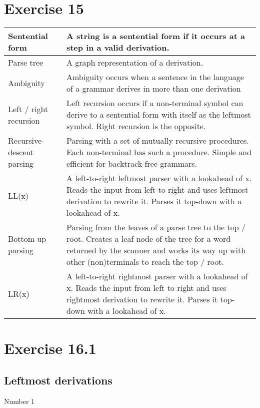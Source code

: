 \documentclass[11pt]{article} %
\begin{document}
\section*{Exercise 15}
\begin{tabular}{l|p{11cm}} \hline

Sentential form
& A string is a sentential form if it occurs at a step in a valid derivation. \\\hline

Parse tree
& A graph representation of a derivation. \\\hline

Ambiguity
& Ambiguity occurs when a sentence in the language of a grammar derives in more than one derivation \\\hline

Left / right recursion
& Left recursion occurs if a non-terminal symbol can derive to a sentential form with itself as the leftmost symbol. Right recursion is the opposite. \\\hline

Recursive-descent parsing
& Parsing with a set of mutually recursive procedures. Each non-terminal has such a procedure. Simple and efficient for backtrack-free grammars. \\\hline

LL(x)
& A left-to-right leftmost parser with a lookahead of x. Reads the input from left to right and uses leftmost derivation to rewrite it. Parses it top-down with a lookahead of x. \\\hline

Bottom-up parsing
& Parsing from the leaves of a parse tree to the top / root. Creates a leaf node of the tree for a word returned by the scanner and works its way up with other (non)terminals to reach the top / root. \\\hline

LR(x)
& A left-to-right rightmost parser with a lookahead of x. Reads the input from left to right and uses rightmost derivation to rewrite it. Parses it top-down with a lookahead of x. \\\hline

\end{tabular}

\section*{Exercise 16.1}

\subsection*{Leftmost derivations}
\noindent Number 1
\end{document}
